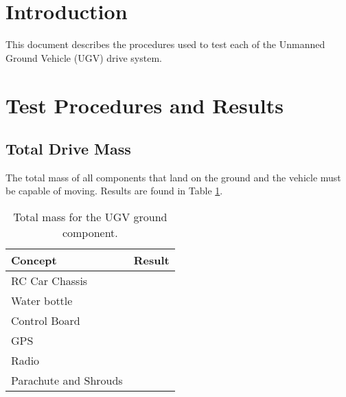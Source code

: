 \documentclass[]{auvsi_doc}
\begin{document}
\begin{AUVSITitlePage}
\begin{artifacttable}

\end{artifacttable}
\end{AUVSITitlePage}

\section{Introduction}
This document describes the procedures used to test each of the Unmanned Ground Vehicle (UGV) drive system.

\section {Test Procedures and Results}
	\subsection{Total Drive Mass}

	The total mass of all components that land on the ground and the vehicle must be capable of moving. Results are found in Table \ref{mass}.


	\begin{table}[!h]
	\centering
	
	\caption{Total mass for the UGV ground component.}
\label{mass}
	\begin{tabular}{|l|l|}
		\hline
		\rowcolor[HTML]{C0C0C0}
		\textbf{Concept}       & \textbf{Result} \\
		\hline
		RC Car Chassis              &                 \\
		Water bottle    &                 \\
		Control Board               &                 \\
		GPS                 & 			 \\
		Radio                 & 			 \\
		Parachute and Shrouds                 & 			 \\
		\hline
	\end{tabular}
	\end{table}


\end{document}
